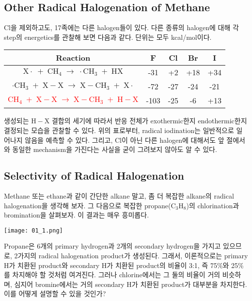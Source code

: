 \documentclass[a4paper, 9pt]{article}
\begin{document}
\subsection{Other Radical Halogenation of Methane}
Cl을 제외하고도, 17족에는 다른 halogen들이 있다. 다른 종류의 halogen에 대해 각 step의 energetics를 관찰해 보면 다음과 같다. 단위는 모두 kcal/mol이다.
\begin{center}
	\begin{tabular}{|c|c|c|c|c|}
		\hline
		Reaction & F & Cl & Br & I \\
		\hline
		$\mathrm{X\cdot\;+\;CH_{4}\;\rightarrow\;\cdot{C}H_{3}\;+\;HX}$ & -31 & +2 & +18 & +34 \\
		$\mathrm{\cdot{C}H_{3}\;+\;X-X\;\rightarrow\;X-CH_{3}\;+\;X\cdot}$ & -72 & -27 & -24 & -21 \\
		\hline
		\textcolor{red}{$\mathrm{CH_{4}\;+\;X-X\;\rightarrow\;X-CH_{3}\;+\;H-X}$} & -103 & -25 & -6 & +13 \\
		\hline
	\end{tabular}
\end{center}
생성되는 $\mathrm{H-X}$ 결합의 세기에 따라서 반응 전체가 exothermic한지 endothermic한지 결정되는 모습을 관찰할 수 있다. 위의 표로부터, radical iodination는 일반적으로 일어나지 않음을 예측할 수 있다. 그리고, Cl이 아닌 다른 halogen에 대해서도 앞 절에서와 동일한 mechanism을 가진다는 사실을 굳이 그려보지 않아도 알 수 있다.

\subsection{Selectivity of Radical Halogenation}
Methane 또는 ethane과 같이 간단한 alkane 말고, 좀 더 복잡한 alkane의 radical halogenation을 생각해 보자. 그 다음으로 복잡한 propane($\mathrm{C_{3}H_{8}}$)의 chlorination과 bromination을 살펴보자. 이 결과는 매우 흥미롭다.
\begin{figure*}[htbp]
\centering
\texttt{[image: 01\_1.png]}	
\end{figure*}

Propane은 6개의 primary hydrogen과 2개의 secondary hydrogen을 가지고 있으므로, 2가지의 radical halogenation product가 생성된다. 그래서, 이론적으로는 primary H가 치환된 product와 secondary H가 치환된 product의 비율이 3:1, 즉 75\%와 25\%를 차지해야 할 것처럼 여겨진다. 그러나 chlorine에서는 그 둘의 비율이 거의 비슷하며, 심지어 bromine에서는 거의 secondary H가 치환된 product가 대부분을 차지한다. 이를 어떻게 설명할 수 있을 것인가?
\end{document}
